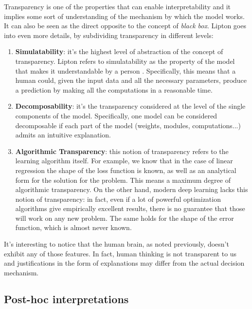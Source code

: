 Transparency is one of the properties that can enable interpretability and it implies some sort of understanding of the mechanism by which the model works. It can also be seen as the direct opposite to the concept of \textit{black box}. Lipton \cite{lipton2017mythos} goes into even more details, by subdividing transparency in different levels:
\begin{enumerate}
	\item \textbf{Simulatability}: it's the highest level of abstraction of the concept of transparency. Lipton refers to simulatability as the property of the model that makes it understandable by a person . Specifically, this means that a human could, given the input data and all the necessary parameters, produce a prediction by making all the computations in a reasonable time. 
	\item \textbf{Decomposability}: it's the transparency considered at the level of the single components of the model. Specifically, one model can be considered decomposable if each part of the model (weights, modules, computations...) admits an intuitive explanation.
	\item \textbf{Algorithmic Transparency}: this notion of transparency refers to the learning algorithm itself. For example, we know that in the case of linear regression the shape of the loss function is known, as well as an analytical form for the solution for the problem. This means a maximum degree of algorithmic transparency. On the other hand, modern deep learning lacks this notion of transparency: in fact, even if a lot of powerful optimization algorithms give empirically excellent results, there is no guarantee that those will work on any new problem. The same holds for the shape of the error function, which is almost never known.
\end{enumerate}

It's interesting to notice that the human brain, as noted previously, doesn't exhibit any of those features. In fact, human thinking is not transparent to us and justifications in the form of explanations may differ from the actual decision mechanism.

\subsection{Post-hoc interpretations}

